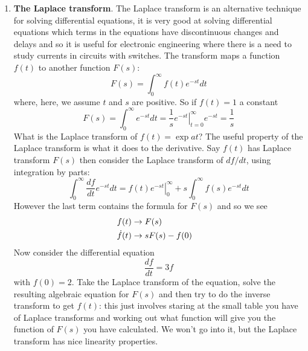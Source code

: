 \documentclass[11pt,a4paper]{scrartcl}
\begin{document}
\begin{enumerate}
       \item \textbf{The Laplace transform}. The Laplace transform is an alternative technique for solving differential equations, it is very good at solving differential equations which terms in the equations have discontinuous changes and delays and so it is useful for electronic engineering where there is a need to study currents in circuits with switches. The transform maps a function $f(t)$ to another function $F(s)$:
         \begin{equation}
           F(s)=\int_0^\infty f(t)e^{-st}dt
         \end{equation}
         where, here, we assume $t$ and $s$ are positive. So if $f(t)=1$ a constant
         \begin{equation}
           F(s)=\int_0^{\infty}e^{-st}dt=\frac{1}{s}\left.e^{-st}\right|_{t=0}^{\infty} e^{-st}=\frac{1}{s}
         \end{equation}
         What is the Laplace transform of $f(t)=\exp{at}$? The useful property of the Laplace transform is what it does to the derivative. Say $f(t)$ has Laplace transform $F(s)$ then consider the Laplace transform of $df/dt$, using integration by parts:
         \begin{equation}
           \int_0^\infty\frac{df}{dt}e^{-st}dt=\left.f(t)e^{-st}\right|_0^\infty +s\int_0^{\infty}f(s)e^{-st}dt
         \end{equation}
         However the last term contains the formula for $F(s)$ and so we see
         \begin{align}
           f(t)&\rightarrow F(s)\cr
           \dot{f}(t)&\rightarrow sF(s)-f(0)
         \end{align}
         Now consider the differential equation
         \begin{equation}
           \frac{df}{dt}=3f
         \end{equation}
         with $f(0)=2$. Take the Laplace transform of the equation,
         solve the resulting algebraic equation for $F(s)$ and then
         try to do the inverse transform to get $f(t)$: this just
         involves staring at the small table you have of Laplace
         transforms and working out what function will give you the
         function of $F(s)$ you have calculated. We won't go into it,
         but the Laplace transform has nice linearity properties.
         
        

\end{enumerate}
        
\end{document}
